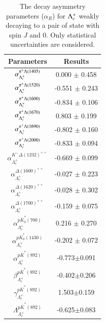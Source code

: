 \begin{table}[h]
    \centering
    \caption{The decay asymmetry parameters ($\alpha_R$) for $\Lambda_{c}^{+}$ weakly decaying to a pair of state with spin $J$ and 0. Only statistical uncertainties are considered.}
    \label{tab:fit_asymmetry}
    \begin{tabular}{cc}
        \hline\hline
    Parameters  & Results \\\hline
    $ \alpha_{\Lambda_c^+}^{\pi^+\Lambda(1405)} $ &  0.000 $\pm$ 0.458 \\
    $ \alpha_{\Lambda_c^+}^{\pi^+\Lambda(1520)} $ &  -0.551 $\pm$ 0.243 \\
    $ \alpha_{\Lambda_c^+}^{\pi^+\Lambda(1600)} $ &  -0.834 $\pm$ 0.106 \\
    $ \alpha_{\Lambda_c^+}^{\pi^+\Lambda(1670)} $ &  0.803 $\pm$ 0.199 \\
    $ \alpha_{\Lambda_c^+}^{\pi^+\Lambda(1690)} $ &  -0.802 $\pm$ 0.160 \\
    $ \alpha_{\Lambda_c^+}^{\pi^+\Lambda(2000)} $ &  -0.833 $\pm$ 0.094 \\
    $ \alpha_{\Lambda_c^+}^{K^-\Delta(1232)^{++}} $ &  -0.669 $\pm$ 0.099 \\
    $ \alpha_{\Lambda_c^+}^{\Delta(1600)^{++}} $ &  -0.027 $\pm$ 0.223 \\
    $ \alpha_{\Lambda_c^+}^{\Delta(1620)^{++}} $ &  -0.028 $\pm$ 0.302 \\
    $ \alpha_{\Lambda_c^+}^{\Delta(1700)^{++}} $ &  -0.159 $\pm$ 0.075 \\
    $ \alpha_{\Lambda_c^+}^{p\overline{K}^{*}_{0}(700)} $ &  0.216 $\pm$ 0.270 \\
    $ \alpha_{\Lambda_c^+}^{p\overline{K}^{*}_{0}(1430)} $ &  -0.202 $\pm$ 0.072 \\
    $\alpha_{\Lambda_c^+}^{p\overline{K}^*(892)}$ & -0.773$\pm$0.091\\
    $\beta_{\Lambda_c^+}^{p\overline{K}^*(892)}$ & -0.402$\pm$0.206\\
    $\gamma_{\Lambda_c^+}^{p\overline{K}^*(892)}$ & 1.503$\pm$0.159\\
    $\Lambda_{\Lambda_c^+}^{p\overline{K}^*(892)}$ & -0.625$\pm$0.083\\
    \hline\hline
    \end{tabular}
\end{table}

\clearpage
